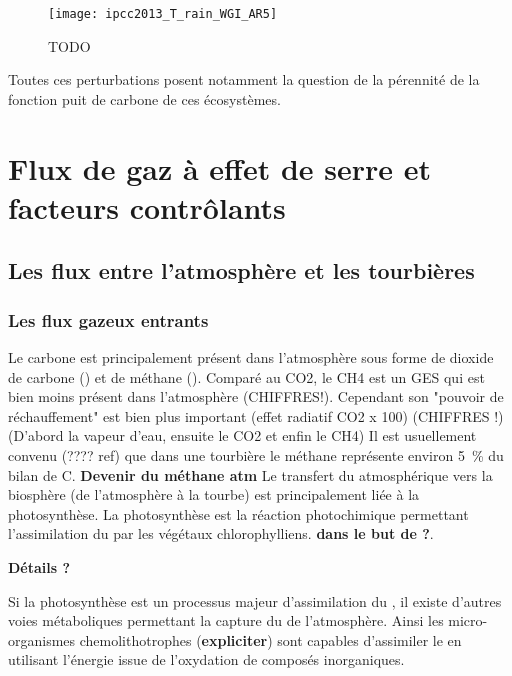 \begin{figure}
\centering
\texttt{[image: ipcc2013\_T\_rain\_WGI\_AR5]}
\caption{TODO}
\label{fig:ipcc2013_T_rain}
\end{figure}

Toutes ces perturbations posent notamment la question de la pérennité de la fonction puit de carbone de ces écosystèmes.


\section{Flux de gaz à effet de serre et facteurs contrôlants}

\subsection{Les flux entre l'atmosphère et les tourbières}

\subsubsection{Les flux gazeux entrants}

Le carbone est principalement présent dans l'atmosphère sous forme de dioxide de carbone (\COO) et de méthane (\CHH).
Comparé au CO2, le CH4 est un GES qui est bien moins présent dans l'atmosphère (CHIFFRES!).
Cependant son "pouvoir de réchauffement" est bien plus important (effet radiatif CO2 x 100) (CHIFFRES !) (D'abord la vapeur d'eau, ensuite le CO2 et enfin le CH4)
Il est usuellement convenu (???? ref) que dans une tourbière le méthane représente environ \SI{5}{\percent} du bilan de C.
\textbf{Devenir du méthane atm}
Le transfert du \COO atmosphérique vers la biosphère (de l'atmosphère à la tourbe) est principalement \plop liée à la photosynthèse.
La photosynthèse est la réaction photochimique permettant l'assimilation du \COO par les végétaux chlorophylliens.
\textbf{dans le but de ?}.

\textbf{Détails ?}

Si la photosynthèse est un processus majeur d'assimilation du \COO, il existe d'autres voies métaboliques permettant la capture du \COO de l'atmosphère.
Ainsi les micro-organismes chemolithotrophes (\textbf{expliciter}) sont capables d'assimiler le \COO en utilisant l'énergie issue de l'oxydation de composés inorganiques.

